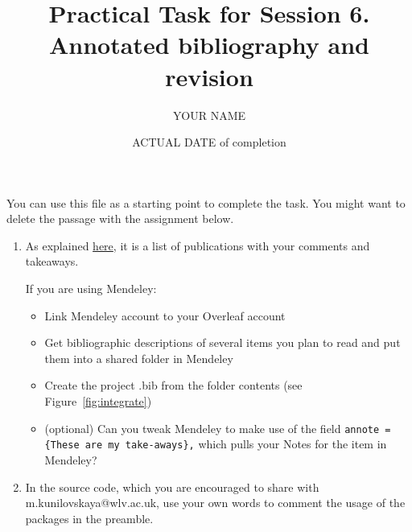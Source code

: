 \documentclass[a4paper,11pt]{article}
\title{Practical Task for Session 6. \\Annotated bibliography and revision}
\author{YOUR NAME}
\date{ACTUAL DATE of completion}
\begin{document}
	
	\maketitle

\bigskip

You can use this file as a starting point to complete the task. You might want to delete the passage with the assignment below.


\begin{enumerate}
	\item As explained \href{https://www.wlv.ac.uk/lib/media/departments/lis/skills/study-guides/LS136-Guide-to-Writing-an-Annotated-Bibliography.pdf}{here}, it is a list of publications with your comments and takeaways.
	
	If you are using Mendeley:
	\begin{itemize}
		\item Link Mendeley account to your Overleaf account
		\item Get bibliographic descriptions of several items you plan to read and put them into a shared folder in Mendeley
		\item Create the project .bib from the folder contents (see Figure~\ref{fig:integrate})
		\item (optional) Can you tweak Mendeley to make use of the field \verb|annote = {These are my take-aways},| which pulls your Notes for the item in Mendeley?
	\end{itemize}
	\item In the source code, which you are encouraged to share with m.kunilovskaya@wlv.ac.uk, use your own words to comment the usage of the packages in the preamble. 
\end{enumerate}
	
\end{document}
